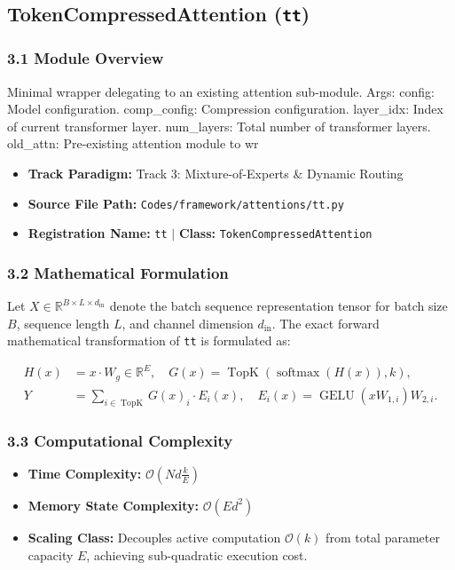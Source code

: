 \subsection{TokenCompressedAttention (\texttt{tt})}
\label{sec:app_module_tt}

\subsubsection*{3.1 Module Overview}
Minimal wrapper delegating to an existing attention sub-module.  Args:     config: Model configuration.     comp\_config: Compression configuration.     layer\_idx: Index of current transformer layer.     num\_layers: Total number of transformer layers.     old\_attn: Pre-existing attention module to wr
\begin{itemize}
    \item \textbf{Track Paradigm:} Track 3: Mixture-of-Experts & Dynamic Routing
    \item \textbf{Source File Path:} \texttt{Codes/framework/attentions/tt.py}
    \item \textbf{Registration Name:} \texttt{tt} $\mid$ \textbf{Class:} \texttt{TokenCompressedAttention}
\end{itemize}

\subsubsection*{3.2 Mathematical Formulation}
Let $X \in \mathbb{R}^{B \times L \times d_{\text{in}}}$ denote the batch sequence representation tensor for batch size $B$, sequence length $L$, and channel dimension $d_{\text{in}}$. The exact forward mathematical transformation of \texttt{tt} is formulated as:

\begin{align}
H(x) &= x \cdot W_g \in \mathbb{R}^{E}, \quad G(x) = \operatorname{TopK}\left(\operatorname{softmax}(H(x)), k\right), \\
Y &= \sum_{i \in \operatorname{TopK}} G(x)_i \cdot E_i(x), \quad E_i(x) = \operatorname{GELU}(x W_{1, i}) W_{2, i}.
\end{align}


\subsubsection*{3.3 Computational Complexity}
\begin{itemize}
    \item \textbf{Time Complexity:} $\mathcal{O}(N d \frac{k}{E})$
    \item \textbf{Memory State Complexity:} $\mathcal{O}(E d^2)$
    \item \textbf{Scaling Class:} Decouples active computation $\mathcal{O}(k)$ from total parameter capacity $E$, achieving sub-quadratic execution cost.
\end{itemize}

